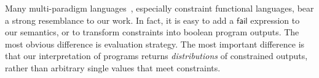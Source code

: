 Many multi-paradigm languages~\cite{cit:hanus-2007lp-multi-paradigm}, especially constraint functional languages, bear a strong resemblance to our work.
In fact, it is easy to add a $\mathsf{fail}$ expression to our semantics, or to transform constraints into boolean program outputs.
The most obvious difference is evaluation strategy.
The most important difference is that our interpretation of programs returns \emph{distributions} of constrained outputs, rather than arbitrary single values that meet constraints.
